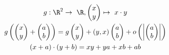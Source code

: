 \begin{bsp*}
	\begin{gather*}
		g: \R^2 \rightarrow \R , \begin{pmatrix} x \\ y \end{pmatrix} \mapsto  x \cdot y \\
		g \left( \begin{pmatrix} x \\ y \end{pmatrix} + \begin{pmatrix} a \\ b \end{pmatrix} \right) = g\begin{pmatrix} x \\ y \end{pmatrix} + (y,x) \begin{pmatrix} a \\ b \end{pmatrix} + o\left( \abs{\begin{pmatrix} a \\ b \end{pmatrix}} \right) \\
		(x+a) \cdot (y+b) = xy + ya + xb + ab %
	\end{gather*}
\end{bsp*}

